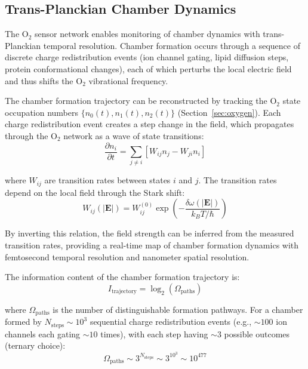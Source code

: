 \documentclass[twocolumn,10pt,aps,prd,superscriptaddress,floatfix,nofootinbib]{revtex4-2}
\theoremstyle{remark}
\begin{document}
\subsection{Trans-Planckian Chamber Dynamics}

The O$_2$ sensor network enables monitoring of chamber dynamics with trans-Planckian temporal resolution. Chamber formation occurs through a sequence of discrete charge redistribution events (ion channel gating, lipid diffusion steps, protein conformational changes), each of which perturbs the local electric field and thus shifts the O$_2$ vibrational frequency.

The chamber formation trajectory can be reconstructed by tracking the O$_2$ state occupation numbers $\{n_0(t), n_1(t), n_2(t)\}$ (Section~\ref{sec:oxygen}). Each charge redistribution event creates a step change in the field, which propagates through the O$_2$ network as a wave of state transitions:
\begin{equation}
\frac{\partial n_i}{\partial t} = \sum_{j \neq i} \left[W_{ij} n_j - W_{ji} n_i\right]
\end{equation}

where $W_{ij}$ are transition rates between states $i$ and $j$. The transition rates depend on the local field through the Stark shift:
\begin{equation}
W_{ij}(|\mathbf{E}|) = W_{ij}^{(0)} \exp\left(-\frac{\delta\omega(|\mathbf{E}|)}{k_B T/\hbar}\right)
\end{equation}

By inverting this relation, the field strength can be inferred from the measured transition rates, providing a real-time map of chamber formation dynamics with femtosecond temporal resolution and nanometer spatial resolution.

The information content of the chamber formation trajectory is:
\begin{equation}
I_{\mathrm{trajectory}} = \log_2(\Omega_{\mathrm{paths}})
\end{equation}

where $\Omega_{\mathrm{paths}}$ is the number of distinguishable formation pathways. For a chamber formed by $N_{\mathrm{steps}} \sim 10^3$ sequential charge redistribution events (e.g., $\sim 100$ ion channels each gating $\sim 10$ times), with each step having $\sim 3$ possible outcomes (ternary choice):
\begin{equation}
\Omega_{\mathrm{paths}} \sim 3^{N_{\mathrm{steps}}} \sim 3^{10^3} \sim 10^{477}
\end{equation}
\end{document}
